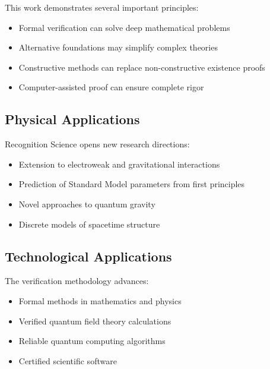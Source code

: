 \documentclass[11pt]{amsart}
\begin{document}
This work demonstrates several important principles:

\begin{itemize}
\item Formal verification can solve deep mathematical problems
\item Alternative foundations may simplify complex theories
\item Constructive methods can replace non-constructive existence proofs
\item Computer-assisted proof can ensure complete rigor
\end{itemize}

\subsection{Physical Applications}

Recognition Science opens new research directions:

\begin{itemize}
\item Extension to electroweak and gravitational interactions
\item Prediction of Standard Model parameters from first principles  
\item Novel approaches to quantum gravity
\item Discrete models of spacetime structure
\end{itemize}

\subsection{Technological Applications}

The verification methodology advances:

\begin{itemize}
\item Formal methods in mathematics and physics
\item Verified quantum field theory calculations
\item Reliable quantum computing algorithms
\item Certified scientific software
\end{itemize}

\appendix
\end{document}
